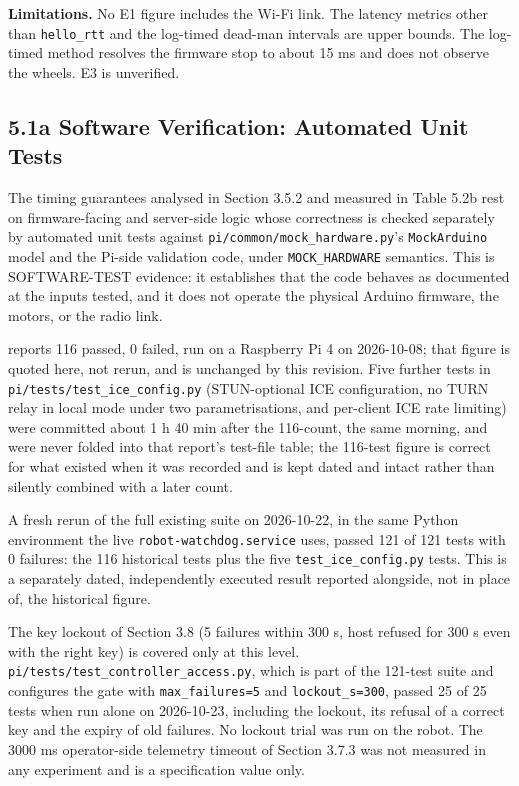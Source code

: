 \textbf{Limitations.} No E1 figure includes the Wi-Fi link. The latency metrics other than \texttt{hello\_rtt} and the log-timed dead-man intervals are upper bounds. The log-timed method resolves the firmware stop to about 15 ms and does not observe the wheels. E3 is unverified.

\subsection*{5.1a Software Verification: Automated Unit Tests}

The timing guarantees analysed in Section 3.5.2 and measured in Table 5.2b rest on firmware-facing and server-side logic whose correctness is checked separately by automated unit tests against \texttt{pi/common/mock\_hardware.py}'s \texttt{MockArduino} model and the Pi-side validation code, under \texttt{MOCK\_HARDWARE} semantics. This is SOFTWARE-TEST evidence: it establishes that the code behaves as documented at the inputs tested, and it does not operate the physical Arduino firmware, the motors, or the radio link.

\texttt{} reports 116 passed, 0 failed, run on a Raspberry Pi 4 on 2026-10-08; that figure is quoted here, not rerun, and \texttt{} is unchanged by this revision. Five further tests in \texttt{pi/tests/test\_ice\_config.py} (STUN-optional ICE configuration, no TURN relay in local mode under two parametrisations, and per-client ICE rate limiting) were committed about 1 h 40 min after the 116-count, the same morning, and were never folded into that report's test-file table; the 116-test figure is correct for what existed when it was recorded and is kept dated and intact rather than silently combined with a later count.

A fresh rerun of the full existing suite on 2026-10-22, in the same Python environment the live \texttt{robot-watchdog.service} uses, passed 121 of 121 tests with 0 failures: the 116 historical tests plus the five \texttt{test\_ice\_config.py} tests. This is a separately dated, independently executed result reported alongside, not in place of, the historical figure.

The key lockout of Section 3.8 (5 failures within 300 s, host refused for 300 s even with the right key) is covered only at this level. \texttt{pi/tests/test\_controller\_access.py}, which is part of the 121-test suite and configures the gate with \texttt{max\_failures=5} and \texttt{lockout\_s=300}, passed 25 of 25 tests when run alone on 2026-10-23, including the lockout, its refusal of a correct key and the expiry of old failures. No lockout trial was run on the robot. The 3000 ms operator-side telemetry timeout of Section 3.7.3 was not measured in any experiment and is a specification value only.

